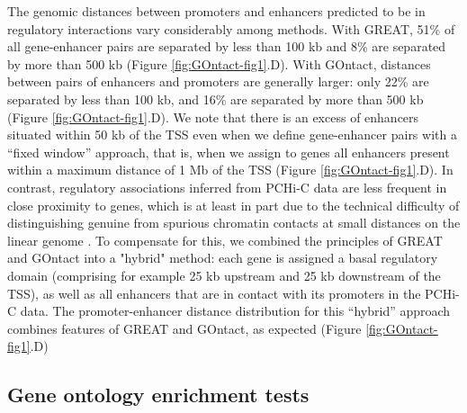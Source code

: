 The genomic distances between promoters and enhancers predicted to be in regulatory interactions vary considerably among methods. With GREAT, 51\% of all gene-enhancer pairs are separated by less than 100 kb and 8\% are separated by more than 500 kb (Figure \ref{fig:GOntact-fig1}.D). With GOntact, distances between pairs of enhancers and promoters are generally larger: only 22\% are separated by less than 100 kb, and 16\% are separated by more than 500 kb (Figure \ref{fig:GOntact-fig1}.D). We note that there is an excess of enhancers situated within 50 kb of the TSS even when we define gene-enhancer pairs with a “fixed window” approach, that is, when we assign to genes all enhancers present within a maximum distance of 1 Mb of the TSS (Figure \ref{fig:GOntact-fig1}.D). In contrast, regulatory associations inferred from PCHi-C data are less frequent in close proximity to genes, which is at least in part due to the technical difficulty of distinguishing genuine from spurious chromatin contacts at small distances on the linear genome \citep{cairns_chicago_2016}. To compensate for this, we combined the principles of GREAT and GOntact into a "hybrid" method: each gene is assigned a basal regulatory domain (comprising for example 25 kb upstream and 25 kb downstream of the TSS), as well as all enhancers that are in contact with its promoters in the PCHi-C data. The promoter-enhancer distance distribution for this “hybrid” approach combines features of GREAT and GOntact, as expected (Figure \ref{fig:GOntact-fig1}.D)


\subsection{Gene ontology enrichment tests}

